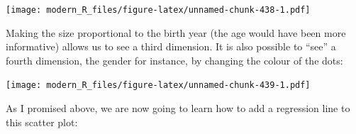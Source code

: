 \documentclass[]{gitbook}
\newenvironment{Shaded}{\begin{snugshade}}{\end{snugshade}}
\newcommand{\DataTypeTok}[1]{\textcolor[rgb]{0.13,0.29,0.53}{#1}}
\newcommand{\KeywordTok}[1]{\textcolor[rgb]{0.13,0.29,0.53}{\textbf{#1}}}
\newcommand{\NormalTok}[1]{#1}
\newcommand{\OperatorTok}[1]{\textcolor[rgb]{0.81,0.36,0.00}{\textbf{#1}}}
\newcommand{\StringTok}[1]{\textcolor[rgb]{0.31,0.60,0.02}{#1}}
\begin{document}
\begin{Shaded}
\end{Shaded}

\texttt{[image: modern\_R\_files/figure-latex/unnamed-chunk-438-1.pdf]}

Making the size proportional to the birth year (the age would have been more informative) allows
us to see a third dimension. It is also possible to ``see'' a fourth dimension, the gender for instance,
by changing the colour of the dots:

\begin{Shaded}
\end{Shaded}

\texttt{[image: modern\_R\_files/figure-latex/unnamed-chunk-439-1.pdf]}

As I promised above, we are now going to learn how to add a regression line to this scatter plot:

\begin{Shaded}
\end{Shaded}
\end{document}
